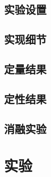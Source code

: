 \subsection{实验设置}




\subsection{实现细节}




\subsection{定量结果}




\subsection{定性结果}




\subsection{消融实验}



\section{实验}
